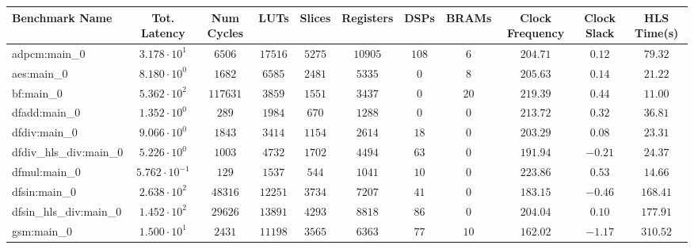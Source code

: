 \begin{tabular}{|l|c|c|c|c|c|c|c|c|c|c|}
\hline
Benchmark Name          & Tot. Latency            & Num Cycles & LUTs       & Slices    & Registers & DSPs    & BRAMs   & Clock Frequency & Clock Slack & HLS Time(s) \\
\hline
adpcm:main\_0           & $ 3.178 \cdot 10^{1}  $ & $ 6506   $ & $ 17516  $ & $ 5275  $ & $ 10905 $ & $ 108 $ & $ 6   $ & $ 204.71      $ & $ 0.12    $ & $ 79.32   $ \\
aes:main\_0             & $ 8.180 \cdot 10^{0}  $ & $ 1682   $ & $ 6585   $ & $ 2481  $ & $ 5335  $ & $ 0   $ & $ 8   $ & $ 205.63      $ & $ 0.14    $ & $ 21.22   $ \\
bf:main\_0              & $ 5.362 \cdot 10^{2}  $ & $ 117631 $ & $ 3859   $ & $ 1551  $ & $ 3437  $ & $ 0   $ & $ 20  $ & $ 219.39      $ & $ 0.44    $ & $ 11.00   $ \\
dfadd:main\_0           & $ 1.352 \cdot 10^{0}  $ & $ 289    $ & $ 1984   $ & $ 670   $ & $ 1288  $ & $ 0   $ & $ 0   $ & $ 213.72      $ & $ 0.32    $ & $ 36.81   $ \\
dfdiv:main\_0           & $ 9.066 \cdot 10^{0}  $ & $ 1843   $ & $ 3414   $ & $ 1154  $ & $ 2614  $ & $ 18  $ & $ 0   $ & $ 203.29      $ & $ 0.08    $ & $ 23.31   $ \\
dfdiv\_hls\_div:main\_0 & $ 5.226 \cdot 10^{0}  $ & $ 1003   $ & $ 4732   $ & $ 1702  $ & $ 4494  $ & $ 63  $ & $ 0   $ & $ 191.94      $ & $ -0.21   $ & $ 24.37   $ \\
dfmul:main\_0           & $ 5.762 \cdot 10^{-1} $ & $ 129    $ & $ 1537   $ & $ 544   $ & $ 1041  $ & $ 10  $ & $ 0   $ & $ 223.86      $ & $ 0.53    $ & $ 14.66   $ \\
dfsin:main\_0           & $ 2.638 \cdot 10^{2}  $ & $ 48316  $ & $ 12251  $ & $ 3734  $ & $ 7207  $ & $ 41  $ & $ 0   $ & $ 183.15      $ & $ -0.46   $ & $ 168.41  $ \\
dfsin\_hls\_div:main\_0 & $ 1.452 \cdot 10^{2}  $ & $ 29626  $ & $ 13891  $ & $ 4293  $ & $ 8818  $ & $ 86  $ & $ 0   $ & $ 204.04      $ & $ 0.10    $ & $ 177.91  $ \\
gsm:main\_0             & $ 1.500 \cdot 10^{1}  $ & $ 2431   $ & $ 11198  $ & $ 3565  $ & $ 6363  $ & $ 77  $ & $ 10  $ & $ 162.02      $ & $ -1.17   $ & $ 310.52  $ \\

\end{tabular}
